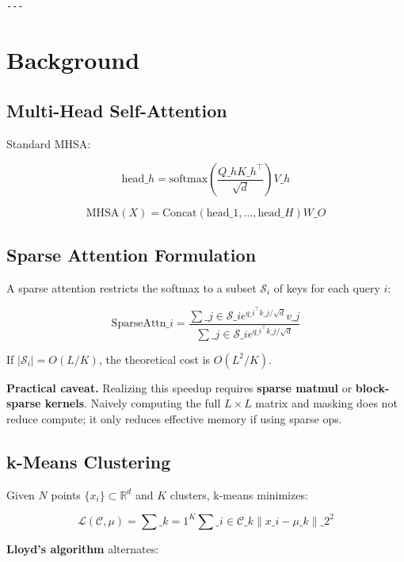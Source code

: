 \begin{lstlisting}

---
\end{lstlisting}


\section{Background}

\subsection{Multi-Head Self-Attention}

Standard MHSA:

\[
\text{head}\_h = \text{softmax}\!\left(\frac{Q\_h K\_h^\top}{\sqrt{d}}\right) V\_h
\tag{3.1}
\]

\[
\text{MHSA}(X) = \text{Concat}(\text{head}\_1, \dots, \text{head}\_H) W\_O
\tag{3.2}
\]

\subsection{Sparse Attention Formulation}

A sparse attention restricts the softmax to a subset $\mathcal{S}_i$ of keys 
for each query $i$:

\[
\text{SparseAttn}\_i = \frac{\sum\_{j \in \mathcal{S}\_i} e^{q\_i^\top k\_j / \sqrt{d}} v\_j}{\sum\_{j \in \mathcal{S}\_i} e^{q\_i^\top k\_j / \sqrt{d}}}
\tag{3.3}
\]

If $|\mathcal{S}_i| = O(L/K)$, the theoretical cost is $O(L^2/K)$.

\textbf{Practical caveat.} Realizing this speedup requires \textbf{sparse matmul} or 
\textbf{block-sparse kernels}. Naively computing the full $L \times L$ matrix and 
masking does not reduce compute; it only reduces effective memory if using 
sparse ops.

\subsection{k-Means Clustering}

Given $N$ points $\{x_i\} \subset \mathbb{R}^d$ and $K$ clusters, k-means 
minimizes:

\[
\mathcal{L}(\mathcal{C}, \mu) = \sum\_{k=1}^{K} \sum\_{i \in \mathcal{C}\_k} \|x\_i - \mu\_k\|\_2^2
\tag{3.4}
\]

\textbf{Lloyd's algorithm} alternates:


